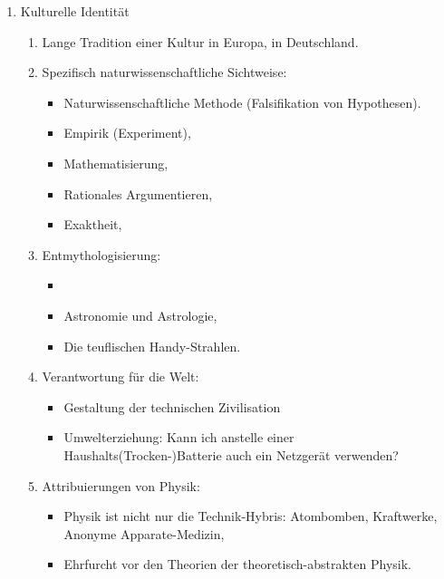 \begin{enumerate}
	\item Kulturelle Identit\"{a}t

	\begin{enumerate}

		\item Lange Tradition einer Kultur in Europa, in Deutschland.

		\item Spezifisch naturwissenschaftliche Sichtweise:
		\begin{itemize}
			\item Naturwissenschaftliche Methode (Falsifikation von Hypothesen).
			\item Empirik (Experiment),
			\item Mathematisierung,
			\item Rationales Argumentieren,
			\item Exaktheit,
		\end{itemize}

		\item Entmythologisierung:
		\begin{itemize}
			\item {}
			\item Astronomie und Astrologie,
			\item Die teuflischen Handy-Strahlen.
		\end{itemize}

		\item Verantwortung f\"{u}r die Welt:
		\begin{itemize}
			\item Gestaltung der technischen Zivilisation
			\item Umwelterziehung: Kann ich anstelle einer Haushalts(Trocken-)Batterie auch ein Netzger\"{a}t verwenden?

		\end{itemize}


		\item Attribuierungen von Physik:
		\begin{itemize}
			\item Physik ist nicht nur die Technik-Hybris: Atombomben, Kraftwerke, Anonyme Apparate-Medizin,
			\item Ehrfurcht vor den Theorien der theoretisch-abstrakten Physik.
		\end{itemize}

	\end{enumerate}


\end{enumerate}
